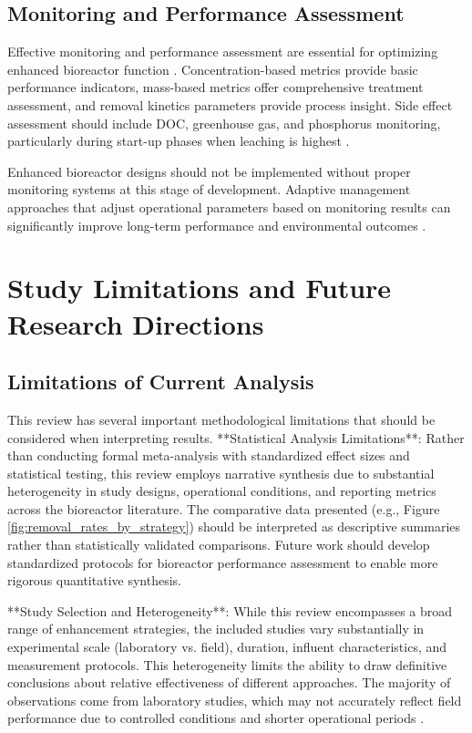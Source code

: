 \documentclass[12pt,a4paper]{article}
\begin{document}
\subsection{Monitoring and Performance Assessment}

Effective monitoring and performance assessment are essential for optimizing enhanced bioreactor function \citep{RN310, RN312}. Concentration-based metrics provide basic performance indicators, mass-based metrics offer comprehensive treatment assessment, and removal kinetics parameters provide process insight. Side effect assessment should include DOC, greenhouse gas, and phosphorus monitoring, particularly during start-up phases when leaching is highest \citep{RN291, RN1181}.

Enhanced bioreactor designs should not be implemented without proper monitoring systems at this stage of development. Adaptive management approaches that adjust operational parameters based on monitoring results can significantly improve long-term performance and environmental outcomes \citep{RN310}.

\section{Study Limitations and Future Research Directions}

\subsection{Limitations of Current Analysis}

This review has several important methodological limitations that should be considered when interpreting results. **Statistical Analysis Limitations**: Rather than conducting formal meta-analysis with standardized effect sizes and statistical testing, this review employs narrative synthesis due to substantial heterogeneity in study designs, operational conditions, and reporting metrics across the bioreactor literature. The comparative data presented (e.g., Figure \ref{fig:removal_rates_by_strategy}) should be interpreted as descriptive summaries rather than statistically validated comparisons. Future work should develop standardized protocols for bioreactor performance assessment to enable more rigorous quantitative synthesis.

**Study Selection and Heterogeneity**: While this review encompasses a broad range of enhancement strategies, the included studies vary substantially in experimental scale (laboratory vs. field), duration, influent characteristics, and measurement protocols. This heterogeneity limits the ability to draw definitive conclusions about relative effectiveness of different approaches. The majority of observations come from laboratory studies, which may not accurately reflect field performance due to controlled conditions and shorter operational periods \citep{RN312}.
\end{document}
